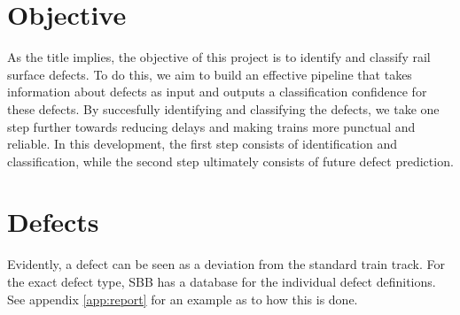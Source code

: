 \section{Objective}
As the title implies, the objective of this project is to identify and classify rail surface defects. To do this, we aim to build an effective pipeline that takes information about defects as input and outputs a classification confidence for these defects. By succesfully identifying and classifying the defects, we take one step further towards reducing delays and making trains more punctual and reliable. In this development, the first step consists of identification and classification, while the second step ultimately consists of future defect prediction. 

\section{Defects}
Evidently, a defect can be seen as a deviation from the standard train track. For the exact defect type, SBB has a database for the individual defect definitions. See appendix \ref{app:report} for an example as to how this is done.


